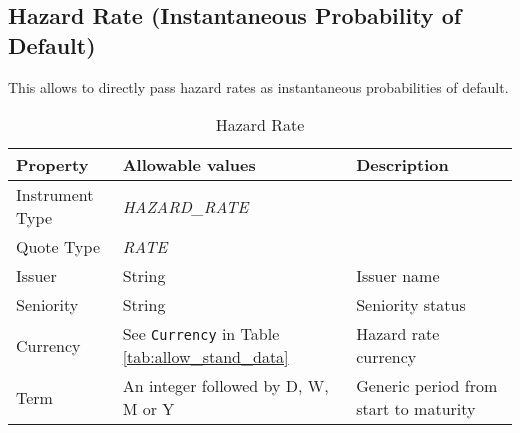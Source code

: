 %
%
%

\subsection{Hazard Rate (Instantaneous Probability of Default)}\label{ss:prob_default_quote}

This allows to directly pass hazard rates as instantaneous probabilities of default.

\begin{table}[H]
\centering
\begin{tabular}{|p{3cm}|p{3.5cm}|p{7cm}|}
  \hline
  {\bf Property} & {\bf Allowable values} & {\bf Description} \\
  \hline
 Instrument Type & \emph{HAZARD\_RATE} & \\ \hline
    Quote Type & \emph{RATE} & \\ \hline
    Issuer & String &  Issuer name \\ \hline
    Seniority & String &  Seniority status \\ \hline
    Currency & See \lstinline!Currency! in Table \ref{tab:allow_stand_data} & Hazard rate currency\\ \hline
    Term & An integer followed by D, W, M or Y & Generic period from start to maturity\\ \hline
\end{tabular}
  \caption{Hazard Rate}
  \label{tab:pd_quote}
\end{table}

